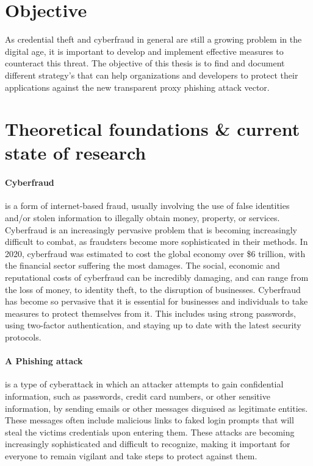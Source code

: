 \documentclass[12pt]{scrbook}
\begin{document}
\section{Objective} As credential theft and cyberfraud in general are still a
growing problem in the digital age, it is important to develop and implement
effective measures to counteract this threat. The objective of this thesis is to
find and document different strategy's that can help organizations and
developers to protect their applications against the new transparent proxy
phishing attack vector.

\section{Theoretical foundations \& current state of research}
\paragraph{Cyberfraud} is a form of internet-based fraud, usually involving the use of false identities
and/or stolen information to illegally obtain money, property, or services.
Cyberfraud is an increasingly pervasive problem that is becoming increasingly
difficult to combat, as fraudsters become more sophisticated in their methods.
In 2020, cyberfraud was estimated to cost the global economy over \$6
trillion\cite{6trillion}, with the financial sector suffering the most damages.
The social, economic and reputational costs of cyberfraud can be incredibly
damaging, and can range from the loss of money, to identity theft, to the
disruption of businesses. Cyberfraud has become so pervasive that it is
essential for businesses and individuals to take measures to protect themselves
from it. This includes using strong passwords, using two-factor authentication,
and staying up to date with the latest security protocols.

\paragraph{A Phishing attack} is a type of cyberattack in which an attacker attempts to gain
confidential information, such as passwords, credit card numbers, or other
sensitive information, by sending emails or other messages disguised as
legitimate entities. These messages often include malicious links to faked login
prompts that will steal the victims credentials upon entering them. These
attacks are becoming increasingly sophisticated and difficult to recognize,
making it important for everyone to remain vigilant and take steps to protect
against them.
\end{document}
